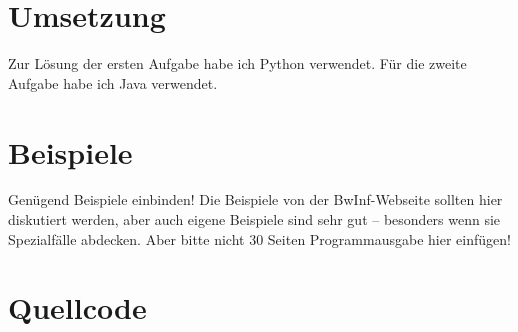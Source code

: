 \documentclass[a4paper,10pt,ngerman]{scrartcl}
\begin{document}
\section{Umsetzung}
Zur Lösung der ersten Aufgabe habe ich Python verwendet. Für die zweite Aufgabe habe ich Java verwendet.

\section{Beispiele}
Genügend Beispiele einbinden! Die Beispiele von der BwInf-Webseite sollten hier
diskutiert werden, aber auch eigene Beispiele sind sehr gut – besonders wenn
sie Spezialfälle abdecken. Aber bitte nicht 30 Seiten Programmausgabe hier
einfügen!

\section{Quellcode}




\begingroup
\def\chapter*#1{}

\endgroup
\end{document}
